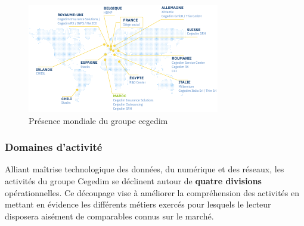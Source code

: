 \begin{figure}[htb!]
    \centering
    \includegraphics[width=\textwidth]{images/sec1/cegedim-presence-mondiale.pdf}
    \caption{Présence mondiale du groupe cegedim}
    \label{fig:international_presence}
\end{figure}

\subsubsection{Domaines d'activité}
Alliant maîtrise technologique des données, du numérique et des réseaux, les activités du groupe Cegedim se déclinent autour de \textbf{quatre divisions} opérationnelles. Ce découpage vise à améliorer la compréhension des activités en mettant en évidence les différents métiers exercés pour lesquels le lecteur disposera aisément de comparables connus sur le marché.\newline
\fboxsep=10pt\relax\fboxrule=2pt\relax%

